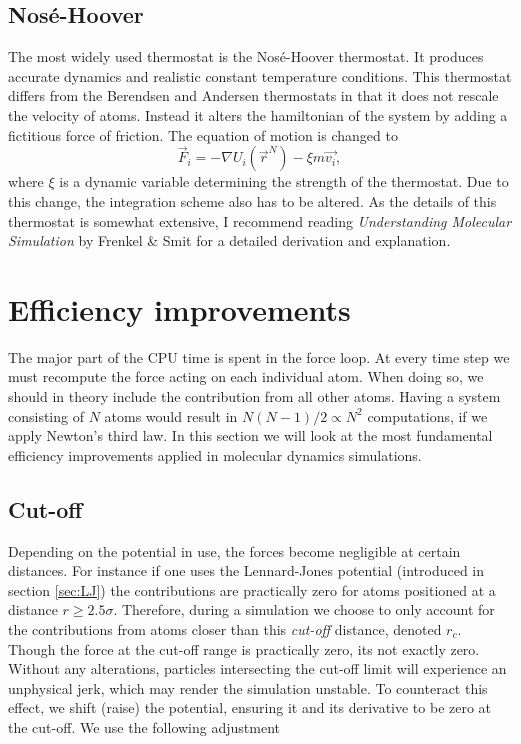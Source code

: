 \documentclass[twoside,english]{uiofysmaster}
\begin{document}
\subsection{Nosé-Hoover}
The most widely used thermostat is the Nosé-Hoover thermostat. 
It produces  accurate dynamics and realistic constant temperature conditions. 
This thermostat differs from the Berendsen and Andersen thermostats in that it does not rescale the velocity of atoms. 
Instead it alters the hamiltonian of the system by adding a fictitious force of friction.
The equation of motion is changed to
\begin{equation}
	\vec{F}_i = -\nabla U_i(\vec{r}^N) -\xi m\vec{v_i} ,
\end{equation}    
where $\xi$ is a dynamic variable determining the strength of the thermostat. 
Due to this change, the integration scheme also has to be altered. 
As the details of this thermostat is somewhat extensive, I recommend reading \textit{Understanding Molecular Simulation} by Frenkel \& Smit \cite{understandingMolecularSimulationFrenkelSmit} for a detailed derivation and explanation.

\section{Efficiency improvements}
The major part of the CPU time is spent in the force loop. 
At every time step we must recompute the force acting on each individual atom. 
When doing so, we should in theory include the contribution from all other atoms. 
Having a system consisting of $N$ atoms would result in $N(N-1)/2 \propto N^2$ computations, if we apply Newton's third law.
In this section we will look at the most fundamental efficiency improvements applied in molecular dynamics simulations.

\subsection{Cut-off}
Depending on the potential in use, the forces become negligible at certain distances. 
For instance if one uses the Lennard-Jones potential (introduced in section \ref{sec:LJ}) the contributions are practically zero for atoms positioned at a distance $r\geq2.5\sigma$.
Therefore, during a simulation we choose to only account for the contributions from atoms closer than this \textit{cut-off} distance, denoted $r_c$.  
Though the force at the cut-off range is practically zero, its not exactly zero. 
Without any alterations, particles intersecting the cut-off limit will experience an unphysical jerk, which may render the simulation unstable.  
To counteract this effect, we shift (raise) the potential, ensuring it and its derivative to be zero at the cut-off. 
We use the following adjustment
\end{document}
